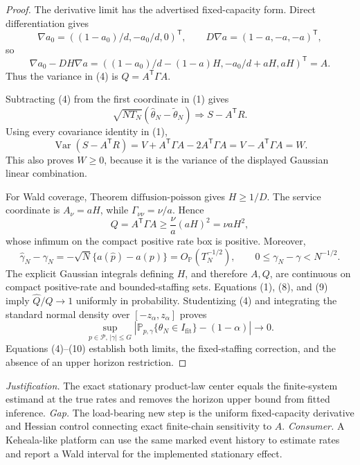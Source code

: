 \documentclass{article}
\begin{document}
\begin{proof}
The derivative limit has the advertised fixed-capacity form.  Direct differentiation gives
\[
 \nabla a_0=((1-a_0)/d,-a_0/d,0)^{\mathsf T},
 \qquad
 D\nabla a=(1-a,-a,-a)^{\mathsf T},
\]
so
\[
 \nabla a_0-DH\nabla a
 =((1-a_0)/d-(1-a)H,-a_0/d+aH,aH)^{\mathsf T}=A.              \tag{5}
\]
Thus the variance in (4) is \(Q=A^{\mathsf T}\Gamma A\).

Subtracting (4) from the first coordinate in (1) gives
\[
 \sqrt{NT_N}(\widehat\theta_N-\widetilde\theta_N)
 \Rightarrow S-A^{\mathsf T}R.                                \tag{6}
\]
Using every covariance identity in (1),
\[
 \operatorname{Var}(S-A^{\mathsf T}R)
 =V+A^{\mathsf T}\Gamma A-2A^{\mathsf T}\Gamma A
 =V-A^{\mathsf T}\Gamma A=W.                                 \tag{7}
\]
This also proves \(W\geq0\), because it is the variance of the displayed Gaussian linear combination.

For Wald coverage, Theorem \(\mathrm{diffusion\mbox{-}poisson}\) gives \(H\geq1/D\).  The service coordinate is \(A_\nu=aH\), while \(\Gamma_{\nu\nu}=\nu/a\).  Hence
\[
 Q=A^{\mathsf T}\Gamma A\geq\frac\nu a(aH)^2=\nu aH^2,     \tag{8}
\]
whose infimum on the compact positive rate box is positive.  Moreover,
\[
 \widehat\gamma_N-\gamma_N
 =-\sqrt N\{a(\widehat p)-a(p)\}=O_{\mathbb P}(T_N^{-1/2}),
 \qquad 0\leq\gamma_N-\gamma<N^{-1/2}.                       \tag{9}
\]
The explicit Gaussian integrals defining \(H\), and therefore \(A,Q\), are continuous on compact positive-rate and bounded-staffing sets.  Equations (1), (8), and (9) imply \(\widehat Q/Q\to1\) uniformly in probability.  Studentizing (4) and integrating the standard normal density over \([-z_\alpha,z_\alpha]\) proves
\[
 \sup_{p\in\mathcal P,\,|\gamma|\leq G}
 \left|\mathbb P_{p,\gamma}\{\theta_N\in I_{\mathrm{fit}}\}-(1-\alpha)\right|
 \longrightarrow0.                                           \tag{10}
\]
Equations (4)--(10) establish both limits, the fixed-staffing correction, and the absence of an upper horizon restriction.
\end{proof}
\par\smallskip\noindent \textit{Justification.} The exact stationary product-law center equals the finite-system estimand at the true rates and removes the horizon upper bound from fitted inference. \textit{Gap.} The load-bearing new step is the uniform fixed-capacity derivative and Hessian control connecting exact finite-chain sensitivity to \(A\). \textit{Consumer.} A Keheala-like platform can use the same marked event history to estimate rates and report a Wald interval for the implemented stationary effect.
\end{document}
